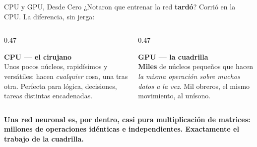 \documentclass[aspectratio=169, 11pt]{beamer}
\begin{document}
\begin{frame}[shrink=5]{CPU y GPU, Desde Cero}
  \vspace{2pt}
  {\scriptsize\color{textMuted}
   ¿Notaron que entrenar la red \textbf{tardó}? Corrió en la CPU. La
   diferencia, sin jerga:}
  \vspace{2pt}
  \begin{columns}[T]
    \begin{column}{0.47\textwidth}
      \begin{tcolorbox}[colback=arcaGray, colframe=arcaDark, boxrule=0pt,
        leftrule=3pt, arc=3pt, left=8pt, right=8pt, top=4pt, bottom=4pt]
        {\scriptsize\color{arcaDark}\bfseries CPU --- el cirujano}\\[3pt]
        {\scriptsize\color{textMuted}
         Unos pocos núcleos, rapidísimos y versátiles: hacen
         \emph{cualquier} cosa, una tras otra. Perfecta para lógica,
         decisiones, tareas distintas encadenadas.}
      \end{tcolorbox}
    \end{column}
    \begin{column}{0.47\textwidth}
      \begin{tcolorbox}[colback=arcaGray, colframe=codeGreen, boxrule=0pt,
        leftrule=3pt, arc=3pt, left=8pt, right=8pt, top=4pt, bottom=4pt]
        {\scriptsize\color{codeGreen}\bfseries GPU --- la cuadrilla}\\[3pt]
        {\scriptsize\color{textMuted}
         \textbf{Miles} de núcleos pequeños que hacen \emph{la misma
         operación sobre muchos datos a la vez}. Mil obreros, el mismo
         movimiento, al unísono.}
      \end{tcolorbox}
    \end{column}
  \end{columns}
  \vspace{2pt}
  \begin{tcolorbox}[colback=arcaGray, colframe=arcaRed, boxrule=0pt,
    leftrule=4pt, arc=3pt, left=10pt, right=10pt, top=4pt, bottom=4pt]
    {\scriptsize\color{arcaDark}\bfseries
     Una red neuronal es, por dentro, casi pura multiplicación de matrices:
     millones de operaciones idénticas e independientes. Exactamente el
     trabajo de la cuadrilla.}
  \end{tcolorbox}
\end{frame}
\end{document}
